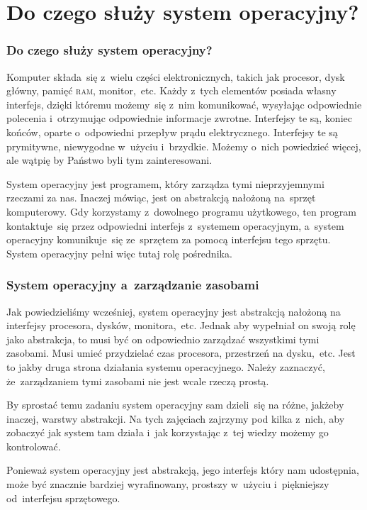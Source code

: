 \documentclass[10pt,t]{beamer}
\begin{document}
\section{Do czego służy system operacyjny?}


\begin{frame}
  \frametitle{Do czego służy system operacyjny?}


  Komputer składa~się z~wielu części elektronicznych, takich jak procesor,
  dysk główny, pamięć \textsc{ram}, monitor,~etc. Każdy z~tych elementów
  posiada własny interfejs, dzięki któremu możemy~się z~nim komunikować,
  wysyłając odpowiednie polecenia i~otrzymując odpowiednie informacje
  zwrotne. Interfejsy te są, koniec końców, oparte o~odpowiedni przepływ
  prądu elektrycznego. Interfejsy te są prymitywne, niewygodne w~użyciu
  i~brzydkie. Możemy o~nich powiedzieć więcej, ale wątpię by Państwo byli
  tym zainteresowani.

  System operacyjny jest programem, który zarządza tymi nieprzyjemnymi
  rzeczami za nas. Inaczej mówiąc, jest on abstrakcją nałożoną na~sprzęt
  komputerowy. Gdy korzystamy z~dowolnego programu użytkowego, ten program
  kontaktuje~się przez odpowiedni interfejs z~systemem operacyjnym,
  a~system operacyjny komunikuje~się ze~sprzętem za pomocą interfejsu tego
  sprzętu. System operacyjny pełni więc tutaj rolę pośrednika.

\end{frame}










\begin{frame}
  \frametitle{System operacyjny a~zarządzanie zasobami}


  Jak powiedzieliśmy wcześniej, system operacyjny jest abstrakcją nałożoną
  na interfejsy procesora, dysków, monitora,~etc. Jednak aby wypełniał
  on swoją rolę jako abstrakcja, to musi być on odpowiednio
  \alert{zarządzać} wszystkimi tymi zasobami. Musi umieć przydzielać czas
  procesora, przestrzeń na dysku,~etc. Jest to jakby druga strona działania
  systemu operacyjnego. Należy zaznaczyć, że~zarządzaniem tymi zasobami nie
  jest wcale rzeczą prostą.

  By sprostać temu zadaniu system operacyjny sam dzieli~się na różne,
  jakżeby inaczej, warstwy abstrakcji. Na tych zajęciach zajrzymy pod kilka
  z~nich, aby zobaczyć jak system tam działa i~jak korzystając z~tej wiedzy
  możemy go kontrolować.

  Ponieważ system operacyjny jest abstrakcją, jego interfejs który
  nam udostępnia, może być znacznie bardziej wyrafinowany, prostszy
  w~użyciu i~piękniejszy od~interfejsu sprzętowego.

\end{frame}
\end{document}
